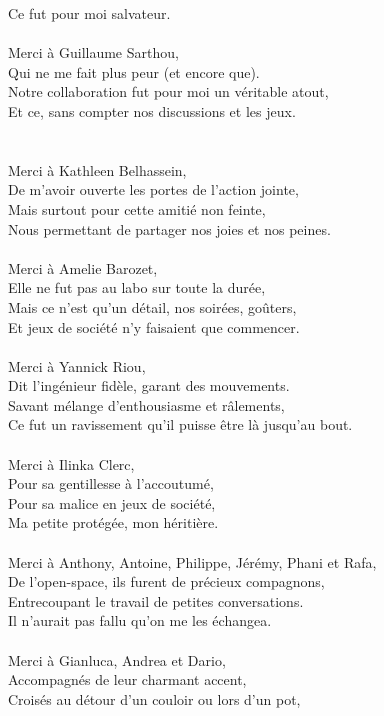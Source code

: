 \documentclass[english,a4paper,11pt,twoside]{StyleThese}
\begin{document}
Ce fut pour moi salvateur.\\
\\
Merci à Guillaume Sarthou,\\
Qui ne me fait plus peur (et encore que).\\
Notre collaboration fut pour moi un véritable atout,\\
Et ce, sans compter nos discussions et les jeux.\\
\\
\\
Merci à Kathleen Belhassein,\\
De m'avoir ouverte les portes de l'action jointe,\\
Mais surtout pour cette amitié non feinte,\\
Nous permettant de partager nos joies et nos peines.\\
\\
Merci à Amelie Barozet,\\
Elle ne fut pas au labo sur toute la durée,\\
Mais ce n'est qu'un détail, nos soirées, goûters,\\
Et jeux de société n'y faisaient que commencer.\\
\\
Merci à Yannick Riou,\\
Dit l'ingénieur fidèle, garant des mouvements.\\
Savant mélange d'enthousiasme et râlements,\\
Ce fut un ravissement qu'il puisse être là jusqu'au bout.\\
\\
Merci à Ilinka Clerc,\\
Pour sa gentillesse à l'accoutumé,\\
Pour sa malice en jeux de société,\\
Ma petite protégée, mon héritière.\\
\\
Merci à Anthony, Antoine, Philippe, Jérémy, Phani et Rafa,\\
De l'open-space, ils furent de précieux compagnons,\\
Entrecoupant le travail de petites conversations.\\
Il n'aurait pas fallu qu'on me les échangea.\\
\\
Merci à Gianluca, Andrea et Dario,\\
Accompagnés de leur charmant accent,\\
Croisés au détour d'un couloir ou lors d'un pot,\\
\end{document}

